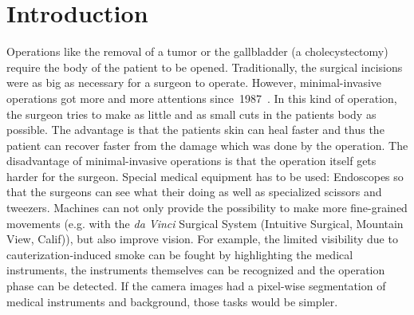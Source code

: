 
\section{Introduction}\label{sec:introduction}
Operations like the removal of a tumor or the gallbladder (a cholecystectomy)
require the body of the patient to be opened. Traditionally, the surgical
incisions were as big as necessary for a surgeon to operate. However,
minimal-invasive operations got more and more attentions
since~1987~\cite{wickham1987new}. In this kind of operation, the surgeon tries
to make as little and as small cuts in the patients body as possible. The
advantage is that the patients skin can heal faster and thus the patient can
recover faster from the damage which was done by the operation. The
disadvantage of minimal-invasive operations is that the operation itself gets
harder for the surgeon. Special medical equipment has to be used: Endoscopes so
that the surgeons can see what their doing as well as specialized scissors and
tweezers. %
Machines can not only provide the possibility to make more fine-grained
movements (e.g. with the \textit{da Vinci} Surgical System (Intuitive Surgical,
Mountain View, Calif)), but also improve vision. For example, the limited
visibility due to cauterization-induced smoke can be fought by highlighting the
medical instruments, the instruments themselves can be recognized and the
operation phase can be detected. If the camera images had a pixel-wise
segmentation of medical instruments and background, those tasks would be
simpler.
